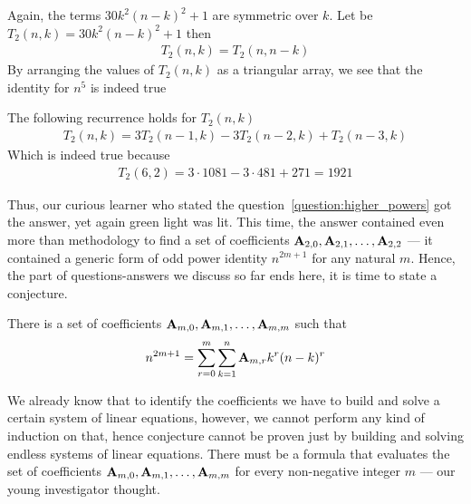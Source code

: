 Again, the terms $30k^2(n-k)^2 + 1$ are symmetric over $k$.
Let be $T_2 (n,k) = 30k^2(n-k)^2 + 1$ then
\begin{align*}
    T_2 (n,k) = T_2 (n,n-k)
\end{align*}
By arranging the values of $T_{2} (n,k)$ as a triangular array, we see that the identity for $n^5$ is indeed true

The following recurrence holds for $T_2 (n,k)$
\begin{align*}
    T_2 (n, k) = 3T_2(n-1, k) - 3T_2(n-2, k) + T_2(n-3, k)
\end{align*}
Which is indeed true because
\begin{align*}
    T_2 (6,2) = 3 \cdot 1081 - 3 \cdot 481 + 271 = 1921
\end{align*}

Thus, our curious learner who stated the question~\eqref{question:higher_powers} got the answer, yet again
green light was lit.
This time, the answer contained even more than methodology to find
a set of coefficients ${\mathbf{A}} \sb{2,0}, {\mathbf{A}} \sb{2,1}, \ldots, {\mathbf{A}} \sb{2,2}$ --- it contained a generic
form of odd power identity $n^{2m+1}$ for any natural $m$.
Hence, the part of questions-answers we discuss so far ends here, it is time to state a conjecture.
\begin{conjecture}
    \label{conj:odd-power-identity}
    There is a set of coefficients ${\mathbf{A}} \sb{m,0}, {\mathbf{A}} \sb{m,1}, \ldots, {\mathbf{A}} \sb{m,m}$ such that
    \begin{align*}
        n^{2m+1} = \sum_{r=0}^{m} \sum_{k=1}^{n} {\mathbf{A}} \sb{m,r} k^r (n-k)^r
    \end{align*}
\end{conjecture}
We already know that to identify the coefficients we have to build and solve
a certain system of linear equations, however, we cannot perform any kind of induction
on that, hence conjecture cannot be proven just by building and solving endless
systems of linear equations.
There must be a formula that evaluates the set of coefficients ${\mathbf{A}} \sb{m,0}, {\mathbf{A}} \sb{m,1}, \ldots, {\mathbf{A}} \sb{m,m}$
for every non-negative integer $m$ --- our young investigator thought.
